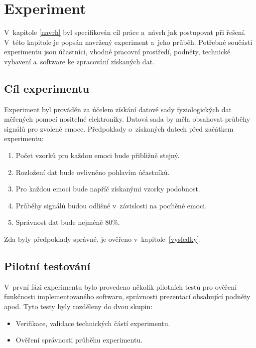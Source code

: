 
    
    \chapter{Experiment}
    \label{experiment}
    V~kapitole \ref{navrh} byl specifikován cíl práce a~návrh jak postupovat při řešení. V~této kapitole je popsán navržený experiment a~jeho průběh. Potřebné součásti experimentu jsou účastníci, vhodné pracovní prostředí, podněty, technické vybavení a~software ke zpracování získaných dat.
    
    \section{Cíl experimentu}
    \label{cil_experimentu}
    Experiment byl prováděn za účelem získání datové sady fyziologických dat měřených pomocí nositelné elektroniky. Datová sada by měla obsahovat průběhy signálů pro zvolené emoce. Předpoklady o~získaných datech před začátkem experimentu:
    \begin{enumerate}
        \item Počet vzorků pro každou emoci bude přibližně stejný.
        \item Rozložení dat bude ovlivněno pohlavím účastníků.
        \item Pro každou emoci bude napříč získanými vzorky podobnost.
        \item Průběhy signálů budou odlišné v~závislosti na pocítěné emoci.
        \item Správnost dat bude nejméně 80\%.
    \end{enumerate}
    
    Zda byly předpoklady správné, je ověřeno v~kapitole~\ref{vysledky}. 
    
    \section{Pilotní testování}
    V~první fázi experimentu bylo provedeno několik pilotních testů pro ověření funkčnosti implementovaného softwaru, správnosti prezentací obsahující podněty apod. Tyto testy byly rozděleny do dvou skupin:
    \begin{itemize}
        \item Verifikace, validace technických částí experimentu.
        \item Ověření správnosti průběhu experimentu.
    \end{itemize} 
    
